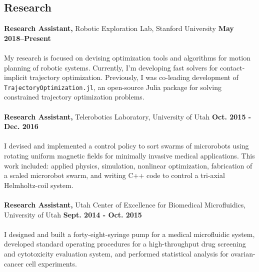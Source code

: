 \documentclass[margin,line]{res}
\begin{document}
\begin{resume}
\section{\sc Research}
{\bf Research Assistant,} Robotic Exploration Lab, Stanford University
\hfill {\bf May 2018--Present}\\
\\
My research is focused on devising optimization tools and algorithms for motion planning of robotic systems. Currently, I'm developing fast solvers for contact-implicit trajectory optimization. Previously, I was co-leading development of \texttt{TrajectoryOptimization.jl}, an open-source Julia package for solving constrained trajectory optimization problems. \\
\\
{\bf Research Assistant,} Telerobotics Laboratory, University of Utah
\hfill {\bf Oct. 2015 - Dec. 2016}\\
\\
I devised and implemented a control policy to sort swarms of microrobots using rotating uniform
magnetic fields for minimally invasive medical applications. This work included: applied physics, simulation, nonlinear optimization, fabrication of a scaled microrobot swarm, and writing C++ code to control a tri-axial Helmholtz-coil system.\\
\\
{\bf Research Assistant,} Utah Center of Excellence for Biomedical Microfluidics, University of Utah
\hfill {\bf Sept. 2014 - Oct. 2015}\\
\\
I designed and built a forty-eight-syringe pump for a medical microfluidic system, developed standard operating procedures for a high-throughput drug screening and cytotoxicity evaluation system, and performed statistical analysis for ovarian-cancer cell experiments.\\


\end{resume}
\end{document}
